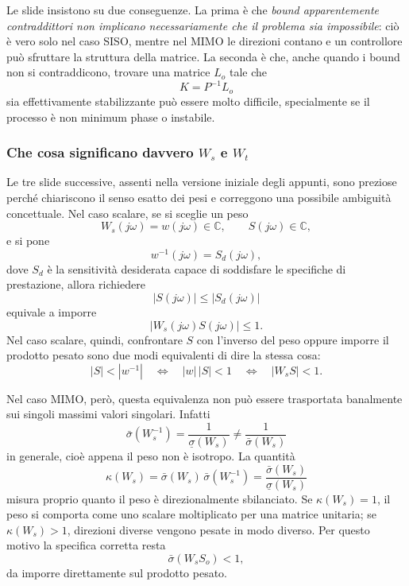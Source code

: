 \documentclass[11pt,a4paper]{article}
\begin{document}
Le slide insistono su due conseguenze. La prima è che \emph{bound apparentemente contraddittori non implicano necessariamente che il problema sia impossibile}: ciò è vero solo nel caso SISO, mentre nel MIMO le direzioni contano e un controllore può sfruttare la struttura della matrice. La seconda è che, anche quando i bound non si contraddicono, trovare una matrice $L_o$ tale che
$$
K=P^{-1}L_o
$$
sia effettivamente stabilizzante può essere molto difficile, specialmente se il processo è non minimum phase o instabile.

\subsubsection{Che cosa significano davvero \texorpdfstring{$W_s$ e $W_t$}{Ws e Wt}}

Le tre slide successive, assenti nella versione iniziale degli appunti, sono preziose perché chiariscono il senso esatto dei pesi e correggono una possibile ambiguità concettuale. Nel caso scalare, se si sceglie un peso
$$
W_s(j\omega)=w(j\omega)\in\mathbb{C},
\qquad
S(j\omega)\in\mathbb{C},
$$
e si pone
$$
w^{-1}(j\omega)=S_d(j\omega),
$$
dove $S_d$ è la sensitività desiderata capace di soddisfare le specifiche di prestazione, allora richiedere
$$
|S(j\omega)| \le |S_d(j\omega)|
$$
equivale a imporre
$$
|W_s(j\omega)S(j\omega)| \le 1.
$$
Nel caso scalare, quindi, confrontare $S$ con l'inverso del peso oppure imporre il prodotto pesato sono due modi equivalenti di dire la stessa cosa:
$$
|S|<|w^{-1}|
\quad\Longleftrightarrow\quad
|w|\,|S|<1
\quad\Longleftrightarrow\quad
|W_sS|<1.
$$

Nel caso MIMO, però, questa equivalenza non può essere trasportata banalmente sui singoli massimi valori singolari. Infatti
$$
\bar{\sigma}(W_s^{-1})=\frac{1}{\underline{\sigma}(W_s)}
\neq
\frac{1}{\bar{\sigma}(W_s)}
$$
in generale, cioè appena il peso non è isotropo. La quantità
$$
\kappa(W_s)=\bar{\sigma}(W_s)\,\bar{\sigma}(W_s^{-1})
=\frac{\bar{\sigma}(W_s)}{\underline{\sigma}(W_s)}
$$
misura proprio quanto il peso è direzionalmente sbilanciato. Se $\kappa(W_s)=1$, il peso si comporta come uno scalare moltiplicato per una matrice unitaria; se $\kappa(W_s)>1$, direzioni diverse vengono pesate in modo diverso. Per questo motivo la specifica corretta resta
$$
\bar{\sigma}(W_s S_o)<1,
$$
da imporre direttamente sul prodotto pesato.
\end{document}
